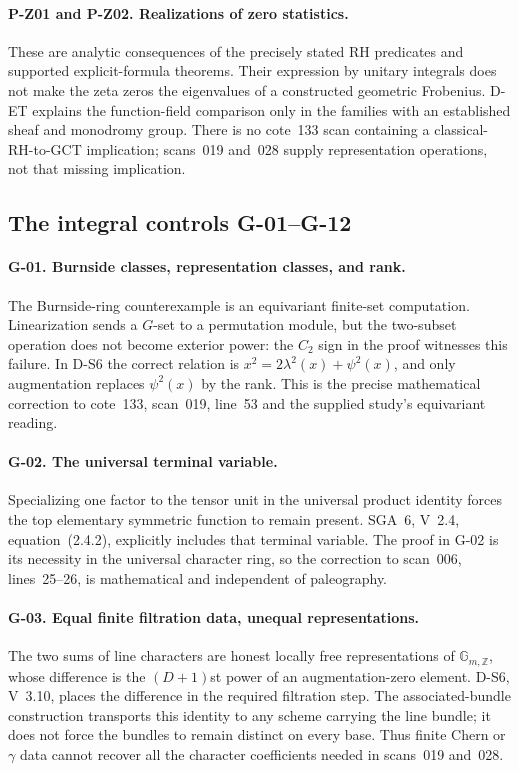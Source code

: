 \paragraph{P-Z01 and P-Z02. Realizations of zero statistics.}
These are analytic consequences of the precisely stated RH predicates and supported explicit-formula theorems. Their expression by unitary integrals does not make the zeta zeros the eigenvalues of a constructed geometric Frobenius. D-ET explains the function-field comparison only in the families with an established sheaf and monodromy group. There is no cote~133 scan containing a classical-RH-to-GCT implication; scans~019 and~028 supply representation operations, not that missing implication.

\subsection{The integral controls G-01--G-12}

\paragraph{G-01. Burnside classes, representation classes, and rank.}
The Burnside-ring counterexample is an equivariant finite-set computation. Linearization sends a $G$-set to a permutation module, but the two-subset operation does not become exterior power: the $C_2$ sign in the proof witnesses this failure. In D-S6 the correct relation is $x^2=2\lambda^2(x)+\psi^2(x)$, and only augmentation replaces $\psi^2(x)$ by the rank. This is the precise mathematical correction to cote~133, scan~019, line~53 and the supplied study's equivariant reading.

\paragraph{G-02. The universal terminal variable.}
Specializing one factor to the tensor unit in the universal product identity forces the top elementary symmetric function to remain present. SGA~6, V~2.4, equation~(2.4.2), explicitly includes that terminal variable. The proof in G-02 is its necessity in the universal character ring, so the correction to scan~006, lines~25--26, is mathematical and independent of paleography.

\paragraph{G-03. Equal finite filtration data, unequal representations.}
The two sums of line characters are honest locally free representations of $\mathbb G_{m,\mathbb Z}$, whose difference is the $(D+1)$st power of an augmentation-zero element. D-S6, V~3.10, places the difference in the required filtration step. The associated-bundle construction transports this identity to any scheme carrying the line bundle; it does not force the bundles to remain distinct on every base. Thus finite Chern or $\gamma$ data cannot recover all the character coefficients needed in scans~019 and~028.


